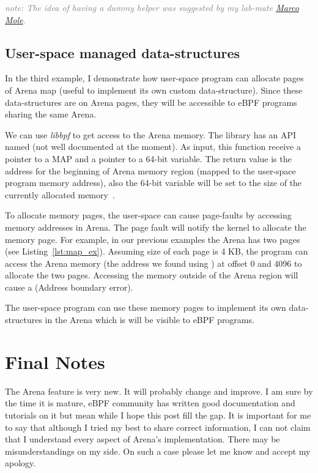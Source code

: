 \documentclass{article}
\begin{document}
\textcolor{gray}{\textit{note: The idea of having a dummy helper was suggested
by my lab-mate \href{https://github.com/marcomole00/}{Marco Mole}.}}


\subsection{User-space managed data-structures}

In the third example, I demonstrate how user-space program can allocate pages
of Arena map (useful to implement its own custom data-structure). Since these
data-structures are on Arena pages, they will be accessible to eBPF programs
sharing the same Arena.

We can use \emph{libbpf} to get access to the Arena memory.
The library has an API named  (not well documented
at the moment). As input, this function receive a pointer to a MAP and a pointer
to a 64-bit variable. The return value is the address for the beginning of Arena
memory region (mapped to the user-space program memory address), also the
64-bit variable will be set to the size of the currently allocated
memory~\cite{libbpf_initial_value}.

To allocate memory pages, the user-space can cause page-faults by accessing
memory addresses in Arena. The page fault will notify the kernel to allocate
the memory page. For example, in our previous examples the Arena has two pages
(see Listing~\ref{lst:map_ex}). Assuming size of each page is 4 KB, the program
can access the Arena memory (the address we found using
) at offset 0 and 4096 to allocate the two pages.
Accessing the memory outside of the Arena region will cause a 
(Address boundary error).

The user-space program can use these memory pages to implement its own
data-structures in the Arena which is will be visible to eBPF programs.


\section{Final Notes}

The Arena feature is very new. It will probably change and improve. I am sure
by the time it is mature, eBPF community has written good documentation and
tutorials on it but mean while I hope this post fill the gap. It is important
for me to say that although I tried my best to share correct information, I can
not claim that I understand every aspect of Arena's implementation. There may
be misunderstandings on my side. On such a case please let me know and accept
my apology.
\end{document}
